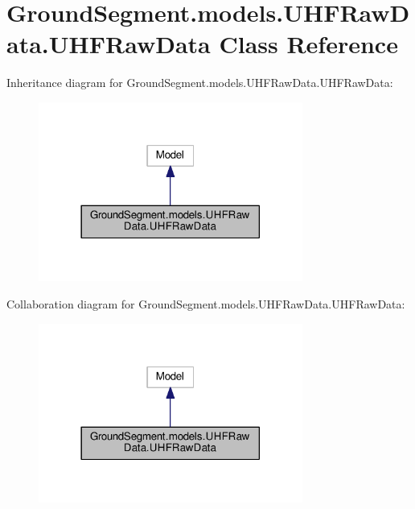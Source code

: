 \hypertarget{class_ground_segment_1_1models_1_1_u_h_f_raw_data_1_1_u_h_f_raw_data}{}\section{Ground\+Segment.\+models.\+U\+H\+F\+Raw\+Data.\+U\+H\+F\+Raw\+Data Class Reference}
\label{class_ground_segment_1_1models_1_1_u_h_f_raw_data_1_1_u_h_f_raw_data}


Inheritance diagram for Ground\+Segment.\+models.\+U\+H\+F\+Raw\+Data.\+U\+H\+F\+Raw\+Data\+:\nopagebreak
\begin{figure}[H]
\begin{center}
\leavevmode
\includegraphics[width=246pt]{class_ground_segment_1_1models_1_1_u_h_f_raw_data_1_1_u_h_f_raw_data__inherit__graph}
\end{center}
\end{figure}


Collaboration diagram for Ground\+Segment.\+models.\+U\+H\+F\+Raw\+Data.\+U\+H\+F\+Raw\+Data\+:\nopagebreak
\begin{figure}[H]
\begin{center}
\leavevmode
\includegraphics[width=246pt]{class_ground_segment_1_1models_1_1_u_h_f_raw_data_1_1_u_h_f_raw_data__coll__graph}
\end{center}
\end{figure}
